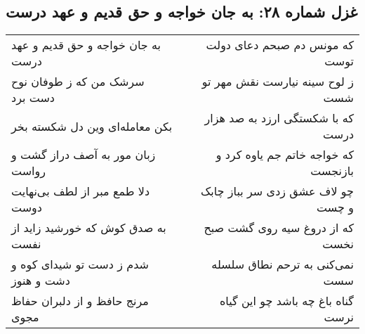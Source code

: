 \begin{center}
\section*{غزل شماره ۲۸: به جان خواجه و حق قدیم و عهد درست}
\label{sec:sh028}
\begin{longtable}{l p{0.5cm} r}
به جان خواجه و حق قدیم و عهد درست
&&
که مونس دم صبحم دعای دولت توست
\\
سرشک من که ز طوفان نوح دست برد
&&
ز لوح سینه نیارست نقش مهر تو شست
\\
بکن معامله‌ای وین دل شکسته بخر
&&
که با شکستگی ارزد به صد هزار درست
\\
زبان مور به آصف دراز گشت و رواست
&&
که خواجه خاتم جم یاوه کرد و بازنجست
\\
دلا طمع مبر از لطف بی‌نهایت دوست
&&
چو لاف عشق زدی سر بباز چابک و چست
\\
به صدق کوش که خورشید زاید از نفست
&&
که از دروغ سیه روی گشت صبح نخست
\\
شدم ز دست تو شیدای کوه و دشت و هنوز
&&
نمی‌کنی به ترحم نطاق سلسله سست
\\
مرنج حافظ و از دلبران حفاظ مجوی
&&
گناه باغ چه باشد چو این گیاه نرست
\\
\end{longtable}
\end{center}
